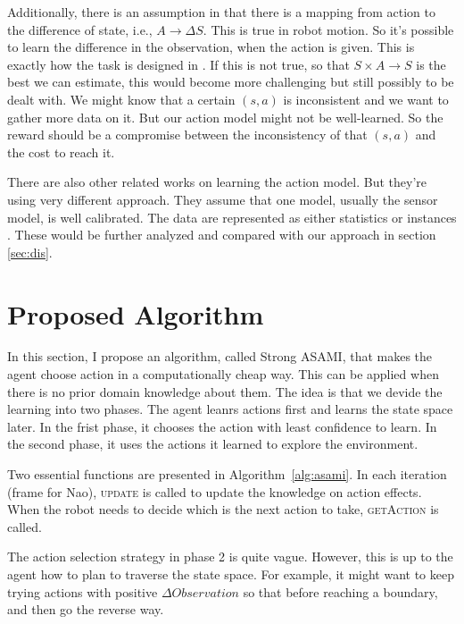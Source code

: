 \documentclass[10pt]{IEEEtran}
\begin{document}
Additionally, there is an assumption in \cite{CSJ06} that there is a
mapping from action to the difference of state, i.e., $A \rightarrow
\Delta S$.  This is true in robot motion. So it's possible to learn
the difference in the observation, when the action is given. This is
exactly how the task is designed in \cite{ICDL10-hester}. If this is
not true, so that $S \times A \rightarrow S$ is the best we can
estimate, this would become more challenging but still possibly to be
dealt with. We might know that a certain $(s, a)$ is inconsistent and
we want to gather more data on it. But our action model might not be
well-learned. So the reward should be a compromise between the
inconsistency of that $(s, a)$ and the cost to reach it.

There are also other related works on learning the action model. But
they're using very different approach. They assume that one model,
usually the sensor model, is well calibrated. The data are represented
as either statistics \cite{And_learningand} or instances
\cite{LNAI2007-ahmadi}. These would be further analyzed and compared
with our approach in section \ref{sec:dis}.

\section{Proposed Algorithm}

In this section, I propose an algorithm, called Strong ASAMI, that
makes the agent choose action in a computationally cheap way. This can
be applied when there is no prior domain knowledge about them. The
idea is that we devide the learning into two phases. The agent leanrs
actions first and learns the state space later. In the frist
phase, it chooses the action with least confidence to learn. In the
second phase, it uses the actions it learned to explore the
environment.

Two essential functions are presented in Algorithm~\ref{alg:asami}. In
each iteration (frame for Nao), \textsc{update} is called to update
the knowledge on action effects. When the robot needs to decide which
is the next action to take, \textsc{getAction} is called.

The action selection strategy in phase 2 is quite vague. However, this
is up to the agent how to plan to traverse the state space. For
example, it might want to keep trying actions with positive $\Delta
Observation$ so that before reaching a boundary, and then go the
reverse way.
\end{document}
